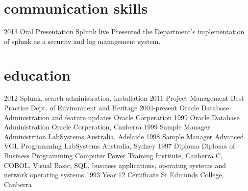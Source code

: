 \documentclass[]{friggeri-cv} %
\begin{document}

\section{communication skills}

\begin{entrylist}
\entry
{2013}
{Oral Presentation}
{Splunk live}
{Presented the Department's implementation of splunk as a security and log management system.}
\end{entrylist}


\section{education}
\begin{entrylist}
\entry
{2012}
{Splunk, search administration, installation}
{ }
{ }
\entry
{2011}
{Project Management Best Practice}
{Dept. of Environment and Heritage}
{ }
\entry
{2004-present}
{Oracle {\normalfont Database Administration and feature updates}}
{Oracle Corperation}
{ }
\entry
{1999}
{Oracle {\normalfont Database Administration}}
{Oracle Corperation, Canberra}
{ }
\entry
{1999}
{Sample Manager {\normalfont Administrtion}}
{LabSystems Australia, Adelaide}
{ }
\entry
{1998}
{Sample Manager {\normalfont Advanced VGL Programming}}
{LabSystems Australia, Sydney}
{ }
\entry
{1997}
{Diploma {\normalfont Diploma of Business Programming}}
{Computer Power Training Institute, Canberra}
{C, COBOL, Visual Basic, SQL, business applications, operating systems and network operating systems}
\entry
{1993}
{Year 12 Certificate}
{St Edmunds College, Canberra}
{ }
\end{entrylist}
\end{document}
